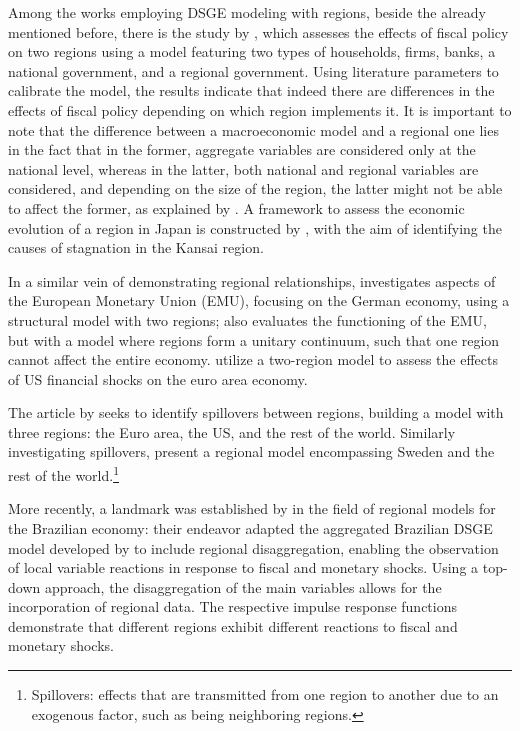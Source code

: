 \documentclass[../thesis.tex]{subfiles}
\begin{document}

Among the works employing DSGE modeling with regions, beside the already mentioned before, there is the study by \textcite{tamegawa_two-region_2012}, which assesses the effects of fiscal policy on two regions using a model featuring two types of households, firms, banks, a national government, and a regional government. Using literature parameters to calibrate the model, the results indicate that indeed there are differences in the effects of fiscal policy depending on which region implements it. It is important to note that the difference between a macroeconomic model and a regional one lies in the fact that in the former, aggregate variables are considered only at the national level, whereas in the latter, both national and regional variables are considered, and depending on the size of the region, the latter might not be able to affect the former, as explained by \textcite{tamegawa_constructing_2013}. 	A framework to assess the economic evolution of a region in Japan is constructed by \textcite{okano_development_2015}, with the aim of identifying the causes of stagnation in the Kansai region.

In a similar vein of demonstrating regional relationships, \textcite{pytlarczyk_estimated_2005} investigates aspects of the European Monetary Union (EMU), focusing on the German economy, using a structural model with two regions; \textcite{gali_optimal_2005} also evaluates the functioning of the EMU, but with a model where regions form a unitary continuum, such that one region cannot affect the entire economy. \textcite{alpanda_international_2014} utilize a two-region model to assess the effects of US financial shocks on the euro area economy.

The article by \textcite{croitorov_financial_2020} seeks to identify spillovers between regions, building a model with three regions: the Euro area, the US, and the rest of the world. Similarly investigating spillovers, \textcite{corbo_maja_2020} present a regional model encompassing Sweden and the rest of the world.\footnote{ Spillovers: effects that are transmitted from one region to another due to an exogenous factor, such as being neighboring regions.}

More recently, a landmark was established by \textcite{osterno_uma_2022} in the field of regional models for the Brazilian economy: their endeavor adapted the aggregated Brazilian DSGE model developed by \textcite{castro_samba_2015} to include regional disaggregation, enabling the observation of local variable reactions in response to fiscal and monetary shocks. Using a top-down approach, the disaggregation of the main variables allows for the incorporation of regional data. The respective impulse response functions demonstrate that different regions exhibit different reactions to fiscal and monetary shocks.
\end{document}

